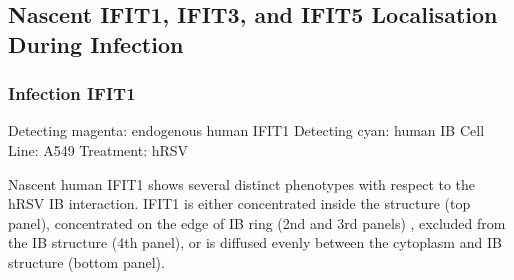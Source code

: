 \subsection{Nascent IFIT1, IFIT3, and IFIT5 Localisation During Infection} \label{subsec:Nascent IFIT1, IFIT3, and IFIT5 Localisation During Infection}
\subsubsection{Infection IFIT1}
Detecting magenta: endogenous human IFIT1 \newline
Detecting cyan: human IB \newline
Cell Line: A549 \newline
Treatment: hRSV \newline

Nascent human IFIT1 shows several distinct phenotypes with respect to the hRSV IB interaction. IFIT1 is either concentrated inside the structure (top panel), concentrated on the edge of IB ring (2nd and 3rd panels)  , excluded from the IB structure (4th panel),  or is diffused evenly between the cytoplasm and IB structure (bottom panel).

